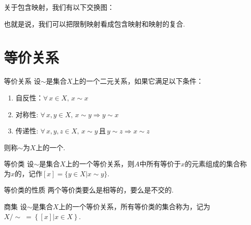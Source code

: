 \begin{remark}
    关于包含映射，我们有以下交换图： \par
    \par

也就是说，我们可以把限制映射看成包含映射和映射的复合.

\section{等价关系}

\begin{definition}{等价关系}
    设$\sim$是集合$X$上的一个二元关系，如果它满足以下条件：
    \begin{enumerate}
        \item 自反性：$\forall\, x\in X,\,x\sim x$
        \item 对称性: $\forall\, x,y\in X,\,x\sim y\Rightarrow y\sim x$
        \item 传递性: $\forall\, x,y,z\in X,\,x\sim y\,\text{且}\,y\sim z\Rightarrow x\sim z$
    \end{enumerate}
    则称$\sim$为$X$上的一个.
\end{definition}

\begin{definition}{等价类}
    设$\sim$是集合$X$上的一个等价关系，则$A$中所有等价于$x$的元素组成的集合称为$x$的，记作$[x]=\{y\in X|x\sim y\}$.
\end{definition}

\begin{proposition}{等价类的性质}
    两个等价类要么是相等的，要么是不交的.
\end{proposition}

\begin{definition}{商集}
    设$\sim$是集合$X$上的一个等价关系，所有等价类的集合称为，记为$X/\sim \;= \left\{[x]|x\in X\right\}$.
\end{definition}





\end{remark}